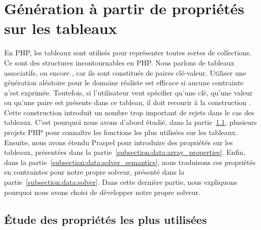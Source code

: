\section{Génération à partir de propriétés sur les tableaux}
\label{section:data:arrays}

En PHP, les tableaux sont utilisés pour représenter toutes sortes de
collections. Ce sont des structures incontournables en PHP. Nous parlons de
tableaux associatifs, ou encore , car ils sont constitués de
paires clé-valeur. Utiliser une génération aléatoire pour le domaine réaliste
 est efficace si aucune contrainte n'est exprimée. Toutefois, si
l'utilisateur veut spécifier qu'une clé, qu'une valeur ou qu'une paire est
présente dans ce tableau, il doit recourir à la construction \apred{\empty}.
Cette construction introduit un nombre trop important de rejets dans le cas des
tableaux. C'est pourquoi nous avons d'abord étudié, dans la
partie~\ref{subsection:data:study}, plusieurs projets PHP pour connaître les
fonctions les plus utilisées sur les tableaux. Ensuite, nous avons étendu
Praspel pour introduire des propriétés sur les tableaux, présentées dans la
partie~\ref{subsection:data:array_properties}.  Enfin, dans la
partie~\ref{subsection:data:solver_semantics}, nous traduisons ces propriétés en
contraintes pour notre propre solveur, présenté dans la
partie~\ref{subsection:data:solver}. Dans cette dernière partie, nous
expliquons pourquoi nous avons choisi de développer notre propre solveur.

\subsection{Étude des propriétés les plus utilisées}
\label{subsection:data:study}

